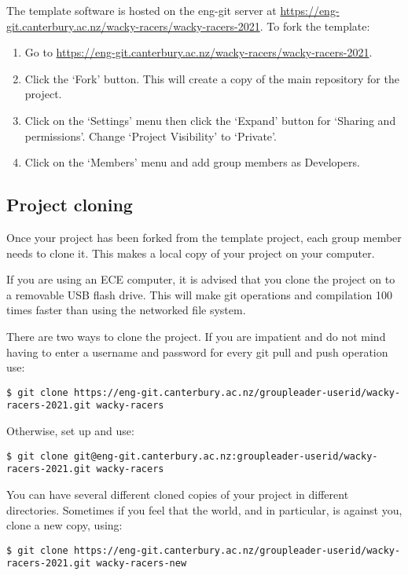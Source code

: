 The template software is hosted on the eng-git  server at
\href{https://eng-git.canterbury.ac.nz/wacky-racers/wacky-racers-2021}{\url{https://eng-git.canterbury.ac.nz/wacky-racers/wacky-racers-2021}}.
To fork the template:

\begin{enumerate}
\item
  Go to
  \href{https://eng-git.canterbury.ac.nz/wacky-racers/wacky-racers-2021}{\url{https://eng-git.canterbury.ac.nz/wacky-racers/wacky-racers-2021}}.
\item
  Click the `Fork' button. This will create a copy of the main repository
  for the project.
\item
  Click on the `Settings' menu then click the `Expand' button for
  `Sharing and permissions'. Change `Project Visibility' to `Private'.
\item
  Click on the `Members' menu and add group members as Developers.
\end{enumerate}


\subsection{Project cloning}
\label{project-cloning}

Once your project has been forked from the template project, each group
member needs to clone it. This makes a local copy of your project on
your computer. 

If you are using an ECE computer, it is advised that you clone the
project on to a removable USB flash drive. This will make git
operations and compilation 100 times faster than using the networked
file system.

There are two ways to clone the project. If you are impatient and do not
mind having to enter a username and password for every git pull and push
operation use:
%
\begin{verbatim}
$ git clone https://eng-git.canterbury.ac.nz/groupleader-userid/wacky-racers-2021.git wacky-racers
\end{verbatim}

Otherwise, set up  and use:
%
\begin{verbatim}
$ git clone git@eng-git.canterbury.ac.nz:groupleader-userid/wacky-racers-2021.git wacky-racers
\end{verbatim}

You can have several different cloned copies of your project in
different directories. Sometimes if you feel that the world,
and  in particular, is against you, clone a new copy,
using:
%
\begin{verbatim}
$ git clone https://eng-git.canterbury.ac.nz/groupleader-userid/wacky-racers-2021.git wacky-racers-new
\end{verbatim}


